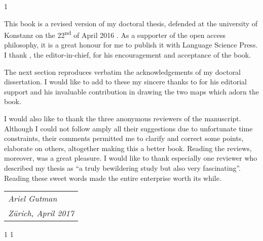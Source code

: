 1

This book is a revised version of my doctoral thesis, defended at the university of Konstanz on the 22\textsuperscript{nd} of April 2016 \citep[see][]{GutmanThesis}. As a supporter of the open access philosophy, it is a great honour for me to publish it with Language Science Press. I thank , the editor-in-chief, for his encouragement and acceptance of the book. 

The next section reproduces verbatim the acknowledgements of my doctoral dissertation. I would like to add to these my sincere thanks to  for his editorial support and his invaluable contribution in drawing the two maps which adorn the book.

I would also like to thank the three anonymous reviewers of the manuscript. Although I could not follow amply all their suggestions due to unfortunate time constraints, their comments permitted me to clarify and 
correct some points, elaborate on others, altogether making this a better book. Reading the reviews, moreover, was a great pleasure. I would like to thank especially one reviewer who described my thesis as \enquote{a truly bewildering study but also very fascinating}. Reading these sweet words made the entire enterprise worth its while.

\begin{flushright}
\begin{tabular}{l}
\textit{Ariel Gutman} \\
\textit{Zürich, April 2017} \\
\end{tabular}
\end{flushright}


1
1

